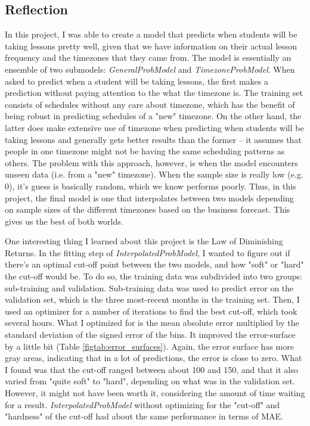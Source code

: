 \documentclass[oneside]{article}
\begin{document}
\subsection{Reflection}

In this project, I was able to create a model that predicts when students will
be taking lessons pretty well, given that we have information on their actual
lesson frequency and the timezones that they came from. The model is
essentially an ensemble of two submodels: \emph{GeneralProbModel} and
\emph{TimezoneProbModel}. When asked to predict when a student will be taking
lessons, the first makes a prediction without paying attention to the what the
timezone is. The training set consists of schedules without any care about
timezone, which has the benefit of being robust in predicting schedules of a
"new" timezone. On the other hand, the latter does make extensive use of
timezone when predicting when students will be taking lessons and generally
gets better results than the former -- it assumes that people in one timezone
might not be having the same scheduling patterns as others. The problem with
this approach, however, is when the model encounters unseen data (i.e. from a
"new" timezone). When the sample size is really low (e.g. 0), it's guess is
basically random, which we know performs poorly.  Thus, in this project, the
final model is one that interpolates between two models depending on sample
sizes of the different timezones based on the business forecast. This gives us
the best of both worlds.

One interesting thing I learned about this project is the Law of Diminishing
Returns. In the fitting step of \emph{InterpolatedProbModel}, I wanted to
figure out if there's an optimal cut-off point between the two models, and how
"soft" or "hard" the cut-off would be. To do so, the training data was
subdivided into two groups: sub-training and validation.  Sub-training data was
used to predict error on the validation set, which is the three most-recent
months in the training set. Then, I used an optimizer for a number of
iterations to find the best cut-off, which took several hours. What I optimized
for is the mean absolute error multiplied by the standard deviation of the
signed error of the bins. It improved the error-surface by a little bit (Table
\ref{figtab:error_surfaces}). Again, the error surface has more gray areas,
indicating that in a lot of predictions, the error is close to zero.  What I
found was that the cut-off ranged between about 100 and 150, and that it also
varied from "quite soft" to "hard", depending on what was in the validation
set.  However, it might not have been worth it, considering the amount of time
waiting for a result. \emph{InterpolatedProbModel} without optimizing for the
"cut-off" and "hardness" of the cut-off had about the same performance in terms
of MAE.
\end{document}
